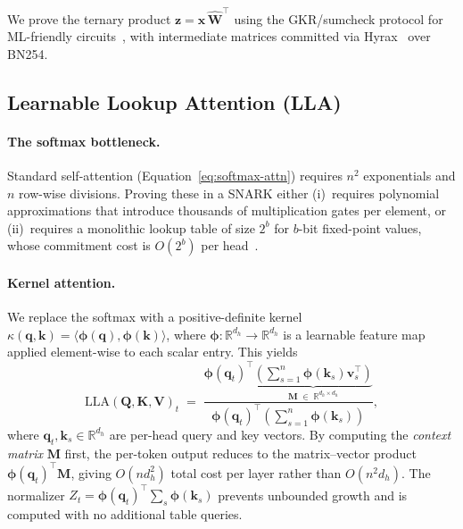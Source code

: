 \documentclass{article}
\newcommand{\RR}{\mathbb{R}}          %
\newcommand{\bphi}{\boldsymbol{\phi}} %
\newcommand{\bq}{\mathbf{q}}
\newcommand{\bk}{\mathbf{k}}
\newcommand{\bv}{\mathbf{v}}
\newcommand{\bx}{\mathbf{x}}
\newcommand{\bz}{\mathbf{z}}
\newcommand{\bW}{\mathbf{W}}
\newcommand{\bM}{\mathbf{M}}
\newcommand{\bQ}{\mathbf{Q}}
\newcommand{\bK}{\mathbf{K}}
\newcommand{\bV}{\mathbf{V}}
\newcommand{\LLA}{\mathrm{LLA}}
\begin{document}
We prove the ternary product $\bz=\bx\,\widehat{\bW}^\top$ using the GKR/sumcheck protocol for ML-friendly circuits~\cite{qu2025zkgpt}, with intermediate matrices committed via Hyrax~\cite{wahby2018doubly} over BN254.


\subsection{Learnable Lookup Attention (LLA)}
\label{subsec:LLA}


\paragraph{The softmax bottleneck.}
Standard self-attention (Equation~\eqref{eq:softmax-attn}) requires
$n^2$ exponentials and $n$ row-wise divisions.  Proving these in a
SNARK either (i)~requires polynomial approximations that introduce
thousands of multiplication gates per element, or (ii)~requires a
monolithic lookup table of size $2^b$ for $b$-bit fixed-point values,
whose commitment cost is $O(2^b)$ per head~\cite{qu2025zkgpt}.

\paragraph{Kernel attention.}
We replace the softmax with a positive-definite kernel
$\kappa(\bq,\bk)=\langle\bphi(\bq),\bphi(\bk)\rangle$, where
$\bphi:\RR^{d_h}\to\RR^{d_h}$ is a learnable feature map applied
element-wise to each scalar entry.  This yields
\begin{equation}
  \LLA(\bQ,\bK,\bV)_t
  \;=\;
  \frac{
    \bphi(\bq_t)^\top
    \underbrace{\!\left(\sum_{s=1}^{n}\bphi(\bk_s)\bv_s^\top\right)\!}_{\displaystyle\bM\;\in\;\RR^{d_h\times d_h}}
  }{
    \bphi(\bq_t)^\top\!\left(\sum_{s=1}^{n}\bphi(\bk_s)\right)
  },
  \label{eq:LLA}
\end{equation}
where $\bq_t,\bk_s\in\RR^{d_h}$ are per-head query and key vectors.
By computing the \emph{context matrix} $\bM$ first, the per-token
output reduces to the matrix–vector product $\bphi(\bq_t)^\top\bM$,
giving $O(nd_h^2)$ total cost per layer rather than $O(n^2 d_h)$.
The normalizer $Z_t=\bphi(\bq_t)^\top\!\sum_s\bphi(\bk_s)$ prevents
unbounded growth and is computed with no additional table queries.
\end{document}
